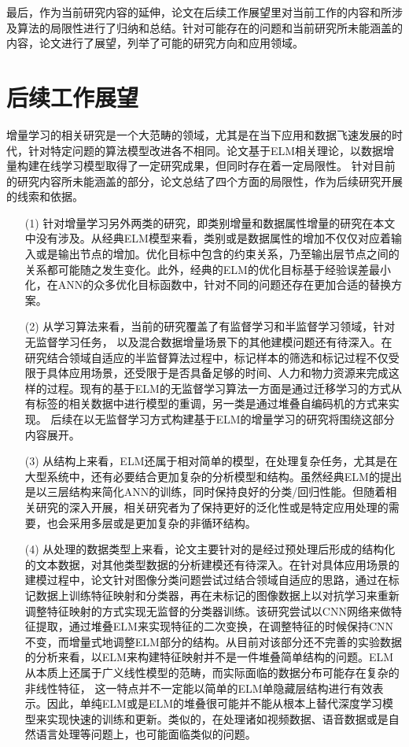 \documentclass{standalone}
\begin{document}
最后，作为当前研究内容的延伸，论文在后续工作展望里对当前工作的内容和所涉及算法的局限性进行了归纳和总结。针对可能存在的问题和当前研究所未能涵盖的内容，论文进行了展望，列举了可能的研究方向和应用领域。



\section{后续工作展望}
增量学习的相关研究是一个大范畴的领域，尤其是在当下应用和数据飞速发展的时代，针对特定问题的算法模型改进各不相同。论文基于ELM相关理论，以数据增量构建在线学习模型取得了一定研究成果，但同时存在着一定局限性。
针对目前的研究内容所未能涵盖的部分，论文总结了四个方面的局限性，作为后续研究开展的线索和依据。
\begin{enumerate}[labelsep = .5em, leftmargin = 0pt, itemindent = 3.8em]
\item[(1)] 针对增量学习另外两类的研究，即类别增量和数据属性增量的研究在本文中没有涉及。从经典ELM模型来看，类别或是数据属性的增加不仅仅对应着输入或是输出节点的增加。优化目标中包含的约束关系，乃至输出层节点之间的关系都可能随之发生变化。此外，经典的ELM的优化目标基于经验误差最小化，在ANN的众多优化目标函数中，针对不同的问题还存在更加合适的替换方案。
\item[(2)] 从学习算法来看，当前的研究覆盖了有监督学习和半监督学习领域，针对无监督学习任务，
以及混合数据增量场景下的其他建模问题还有待深入。在研究结合领域自适应的半监督算法过程中，标记样本的筛选和标记过程不仅受限于具体应用场景，还受限于是否具备足够的时间、人力和物力资源来完成这样的过程。现有的基于ELM的无监督学习算法一方面是通过迁移学习的方式从有标签的相关数据中进行模型的重调，另一类是通过堆叠自编码机的方式来实现。
后续在以无监督学习方式构建基于ELM的增量学习的研究将围绕这部分内容展开。
\item[(3)] 从结构上来看，ELM还属于相对简单的模型，在处理复杂任务，尤其是在大型系统中，还有必要结合更加复杂的分析模型和结构。虽然经典ELM的提出是以三层结构来简化ANN的训练，同时保持良好的分类/回归性能。但随着相关研究的深入开展，相关研究者为了保持更好的泛化性或是特定应用处理的需要，也会采用多层或是更加复杂的非循环结构。
\item[(4)] 从处理的数据类型上来看，论文主要针对的是经过预处理后形成的结构化的文本数据，对其他类型数据的分析建模还有待深入。在针对具体应用场景的建模过程中，论文针对图像分类问题尝试过结合领域自适应的思路，通过在标记数据上训练特征映射和分类器，再在未标记的图像数据上以对抗学习来重新调整特征映射的方式实现无监督的分类器训练。该研究尝试以CNN网络来做特征提取，通过堆叠ELM来实现特征的二次变换，在调整特征的时候保持CNN不变，而增量式地调整ELM部分的结构。从目前对该部分还不完善的实验数据的分析来看，以ELM来构建特征映射并不是一件堆叠简单结构的问题。ELM从本质上还属于广义线性模型的范畴，而实际面临的数据分布可能存在复杂的非线性特征，
这一特点并不一定能以简单的ELM单隐藏层结构进行有效表示。因此，单纯ELM或是ELM的堆叠很可能并不能从根本上替代深度学习模型来实现快速的训练和更新。类似的，在处理诸如视频数据、语音数据或是自然语言处理等问题上，也可能面临类似的问题。
\end{enumerate}
\end{document}
